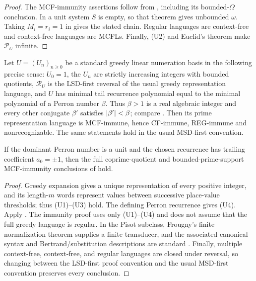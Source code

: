 \begin{proof}
  The MCF-immunity assertions follow from
  , including its
  bounded-\(\Omega\) conclusion. In a unit system \(S\) is empty, so
  that theorem gives unbounded \(\omega\). Taking
  \(M_i=r_i=1\) in
   gives the stated chain.
  Regular languages are context-free and context-free languages are
  MCFLs. Finally, \textup{(U2)} and Euclid's theorem make
  \(\mathcal P_U\) infinite.
\end{proof}

\begin{corollary}
  \label{cor:linear-perron-prime-cf-immunity}
  Let \(U=(U_n)_{n\ge0}\) be a standard greedy linear numeration basis in
  the following precise sense: \(U_0=1\), the \(U_n\) are strictly
  increasing integers with bounded quotients, \(\mathcal R_U\) is the LSD-first
  reversal of the usual greedy representation language, and \(U\)
  has minimal tail recurrence polynomial equal to the minimal polynomial
  of a Perron number \(\beta\). Thus
  \(\beta>1\) is a real algebraic integer and every other conjugate
  \(\beta'\) satisfies \(\lvert \beta' \rvert<\beta\); compare
  \cite{LindMarcus1995,Rigo2014Vol2}. Then its prime
  representation language is MCF-immune, hence CF-immune, REG-immune and
  nonrecognizable. The same statements hold in the usual MSD-first
  convention.

  If the dominant Perron number is a unit and the chosen recurrence has
  trailing coefficient \(a_0=\pm1\), then the full coprime-quotient and
  bounded-prime-support MCF-immunity conclusions of
   hold.
\end{corollary}

\begin{proof}
  Greedy expansion gives a unique representation of every positive
  integer, and its length-\(m\) words represent values between successive
  place-value thresholds; thus \textup{(U1)--(U3)} hold. The defining
  Perron recurrence gives \textup{(U4)}. Apply
  . The immunity proof
  uses only \textup{(U1)--(U4)} and does not assume that the full greedy
  language is regular. In the Pisot subclass, Frougny's finite
  normalization theorem supplies a finite transducer, and the associated
  canonical syntax and Bertrand/substitution descriptions are standard
  \cite{Frougny1992,BruyereHansel1997,Fabre1995,FrougnySolomyak1992}.
  Finally, multiple context-free, context-free, and
  regular languages are closed under reversal, so changing between the LSD-first proof
  convention and the usual MSD-first convention preserves every
  conclusion.
\end{proof}

